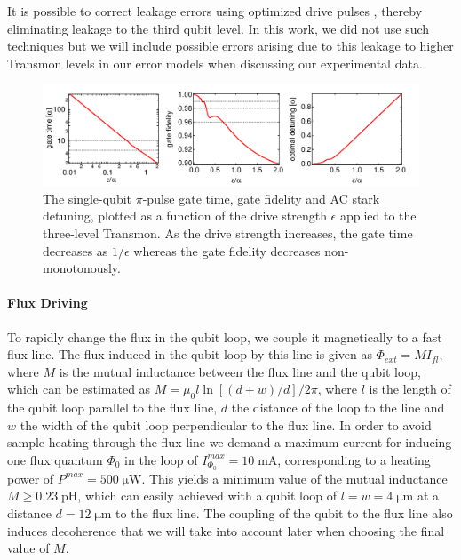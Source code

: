 \smallskip

It is possible to correct leakage errors using optimized drive pulses \cite{lucero_reduced_2010,chow_optimized_2010}, thereby eliminating leakage to the third qubit level. In this work, we did not use such techniques but we will  include possible errors arising due to this leakage to higher Transmon levels in our error models when discussing our experimental data.

\begin{figure}[htp!]
	\centering
	\includegraphics[width=\textwidth]{"./material/mathematica/three_level_driving_errors"}
	\caption[Single-qubit $\pi$-pulse gate time, gate fidelity and AC stark detuning as a function of drive strength]{The single-qubit $\pi$-pulse gate time, gate fidelity and AC stark detuning, plotted as a function of the drive strength $\epsilon$ applied to the three-level Transmon. As the drive strength increases, the gate time decreases as $1/\epsilon$ whereas the gate fidelity decreases non-monotonously.}
	\label{fig:three_level_driving_errors}
\end{figure}

\paragraph{Flux Driving}

To rapidly change the flux in the qubit loop, we couple it magnetically to a fast flux line. The flux induced in the qubit loop by this line is given as $\Phi_{ext}=M I_{fl}$, where $M$ is the mutual inductance between the flux line and the qubit loop, which can be estimated as $M=\mu_0 l \ln{\left[(d+w)/d\right]}/2\pi$, where $l$ is the length of the qubit loop parallel to the flux line, $d$ the distance of the loop to the line and $w$ the width of the qubit loop perpendicular to the flux line. In order to avoid sample heating through the flux line we demand a maximum current for inducing one flux quantum $\Phi_0$ in the loop of $I_{\Phi_0}^{max}=10\;\mathrm{mA}$, corresponding to a heating power of $P^{max}=500\;\mathrm{\mu W}$. This yields a minimum value of the mutual inductance $M\ge 0.23\;\mathrm{pH}$, which can easily achieved with a qubit loop of $l=w=4\;\mathrm{\mu m}$ at a distance $d=12\;\mathrm{\mu m}$ to the flux line. The coupling of the qubit to the flux line also induces decoherence that we will take into account later when choosing the final value of $M$.

